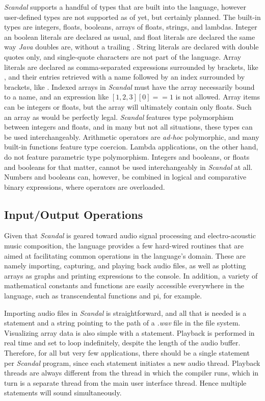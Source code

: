 \emph{Scandal} supports a handful of types that are built into the language, however user-defined types are not supported as of yet, but certainly planned. The built-in types are integers, floats, booleans, arrays of floats, strings, and lambdas. Integer an boolean literals are declared as usual, and float literals are declared the same way \emph{Java} doubles are, without a trailing . String literals are declared with double quotes only, and single-quote characters are not part of the language. Array literals are declared as comma-separated expressions surrounded by brackets, like , and their entries retrieved with a name followed by an index surrounded by brackets, like . Indexed arrays in \emph{Scandal} must have the array necessarily bound to a name, and an expression like $[1, 2, 3][0] == 1$ is not allowed. Array items can be integers or floats, but the array will ultimately contain only floats. Such an array as  would be perfectly legal. \emph{Scandal} features type polymorphism between integers and floats, and in many but not all situations, these types can be used interchangeably. Arithmetic operators are \emph{ad-hoc} polymorphic, and many built-in functions feature type coercion. Lambda applications, on the other hand, do not feature parametric type polymorphism. Integers and booleans, or floats and booleans for that matter, cannot be used interchangeably in \emph{Scandal} at all. Numbers and booleans can, however, be combined in logical and comparative binary expressions, where operators are overloaded.

\subsection{Input/Output Operations}

Given that \emph{Scandal} is geared toward audio signal processing and electro-acoustic music composition, the language provides a few hard-wired routines that are aimed at facilitating common operations in the language's domain. These are namely importing, capturing, and playing back audio files, as well as plotting arrays as graphs and printing expressions to the console. In addition, a variety of mathematical constants and functions are easily accessible everywhere in the language, such as transcendental functions and pi, for example.

Importing audio files in \emph{Scandal} is straightforward, and all that is needed is a  statement and a string pointing to the path of a \emph{.wav} file in the file system. Visualizing array data is also simple with a  statement. Playback is performed in real time and set to loop indefinitely, despite the length of the audio buffer. Therefore, for all but very few applications, there should be a single  statement per \emph{Scandal} program, since each  statement initiates a new audio thread. Playback threads are always different from the thread in which the compiler runs, which in turn is a separate thread from the main user interface thread. Hence multiple  statements will sound simultaneously.

